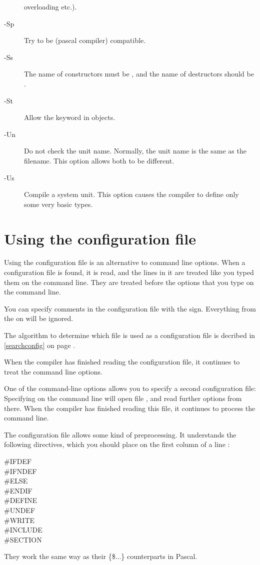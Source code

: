 \documentclass{book}
\begin{document}
\begin{description}
overloading etc.).
\item [-Sp]  Try to be  (\gnu pascal compiler)
compatible.
\item [-Ss]  The name of constructors must be , and the
name of destructors should be .
\item [-St]  Allow the  keyword in objects.
\item [-Un]  Do not check the unit name. Normally, the unit name
is the same as the filename. This option allows both to be different.
\item [-Us]  Compile a system unit. This option causes the
compiler to define only some very basic types.
\end{description}


\section{Using the configuration file}
\label{se:configfile}
Using the configuration file  is an alternative to command
line options. When a configuration file is found, it is read, and the lines
in it are treated like you typed them on the command line. They are treated
before the options that you type on the command line.

You can specify comments in the configuration file with the \var{\#} sign.
Everything from the \var{\#} on will be ignored.

The algorithm to determine which file is used as a configuration file
is decribed in \ref{searchconfig} on page \pageref{searchconfig}.

When the compiler has finished reading the configuration file, it continues
to treat the command line options.

One of the command-line options allows you to specify a second configuration
file: Specifying  on the command line will open file ,
and read further options from there. When the compiler has finished reading
this file, it continues to process the command line.

The configuration file allows some kind of preprocessing. It understands the
following directives, which you should place on the first column of a line :
\begin{description}
\item [\#IFDEF]
\item [\#IFNDEF]
\item [\#ELSE]
\item [\#ENDIF]
\item [\#DEFINE]
\item [\#UNDEF]
\item [\#WRITE]
\item [\#INCLUDE]
\item [\#SECTION]
\end{description}
They work the same way as their \{\$...\}  counterparts in Pascal.
\end{document}
